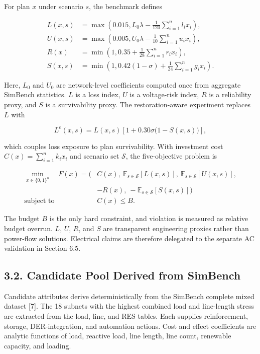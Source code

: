 \documentclass[
  10pt,
  a4paper,
]{article}
\begin{document}
For plan \(x\) under scenario \(s\), the benchmark defines

\[
\begin{aligned}
L(x,s)&=\max\!\left(0.015,L_0\lambda-\frac{1}{120}\sum_{i=1}^{n}l_i x_i\right),\\
U(x,s)&=\max\!\left(0.005,U_0\lambda-\frac{1}{10}\sum_{i=1}^{n}u_i x_i\right),\\
R(x)&=\min\!\left(1,0.35+\frac{1}{28}\sum_{i=1}^{n}r_i x_i\right),\\
S(x,s)&=\min\!\left(1,0.42(1-\sigma)+\frac{1}{24}\sum_{i=1}^{n}g_i x_i\right).
\end{aligned}
\]

Here, \(L_0\) and \(U_0\) are network-level coefficients computed once
from aggregate SimBench statistics. \(L\) is a loss index, \(U\) is a
voltage-risk index, \(R\) is a reliability proxy, and \(S\) is a
survivability proxy. The restoration-aware experiment replaces \(L\)
with

\[
L^{e}(x,s)=L(x,s)\left[1+0.30\sigma\bigl(1-S(x,s)\bigr)\right],
\]

which couples loss exposure to plan survivability. With investment cost
\(C(x)=\sum_{i=1}^{n}k_i x_i\) and scenario set \(\mathcal{S}\), the
five-objective problem is

\[
\begin{aligned}
\min_{x\in\{0,1\}^{n}}\quad
F(x)=\Big(&C(x),\ \mathbb{E}_{s\in\mathcal{S}}[L(x,s)],\
\mathbb{E}_{s\in\mathcal{S}}[U(x,s)],\\
&-R(x),\ -\mathbb{E}_{s\in\mathcal{S}}[S(x,s)]\Big)\\
\text{subject to}\quad &C(x)\leq B.
\end{aligned}
\]

The budget \(B\) is the only hard constraint, and violation is measured
as relative budget overrun. \(L\), \(U\), \(R\), and \(S\) are
transparent engineering proxies rather than power-flow solutions.
Electrical claims are therefore delegated to the separate AC validation
in Section 6.5.

\subsection{3.2. Candidate Pool Derived from
SimBench}\label{candidate-pool-derived-from-simbench}

Candidate attributes derive deterministically from the SimBench complete
mixed dataset {[}7{]}. The 18 subnets with the highest combined load and
line-length stress are extracted from the load, line, and RES tables.
Each supplies reinforcement, storage, DER-integration, and automation
actions. Cost and effect coefficients are analytic functions of load,
reactive load, line length, line count, renewable capacity, and loading.
\end{document}
